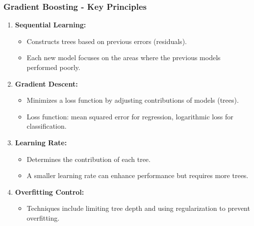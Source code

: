 \documentclass[aspectratio=169]{beamer}
\begin{document}
\begin{frame}[fragile]
    \frametitle{Gradient Boosting - Key Principles}
    
    \begin{enumerate}
        \item \textbf{Sequential Learning:}
        \begin{itemize}
            \item Constructs trees based on previous errors (residuals).
            \item Each new model focuses on the areas where the previous models performed poorly.
        \end{itemize}
        
        \item \textbf{Gradient Descent:}
        \begin{itemize}
            \item Minimizes a loss function by adjusting contributions of models (trees).
            \item Loss function: mean squared error for regression, logarithmic loss for classification.
        \end{itemize}
        
        \item \textbf{Learning Rate:}
        \begin{itemize}
            \item Determines the contribution of each tree.
            \item A smaller learning rate can enhance performance but requires more trees.
        \end{itemize}
        
        \item \textbf{Overfitting Control:}
        \begin{itemize}
            \item Techniques include limiting tree depth and using regularization to prevent overfitting.
        \end{itemize}
    \end{enumerate}
\end{frame}
\end{document}
